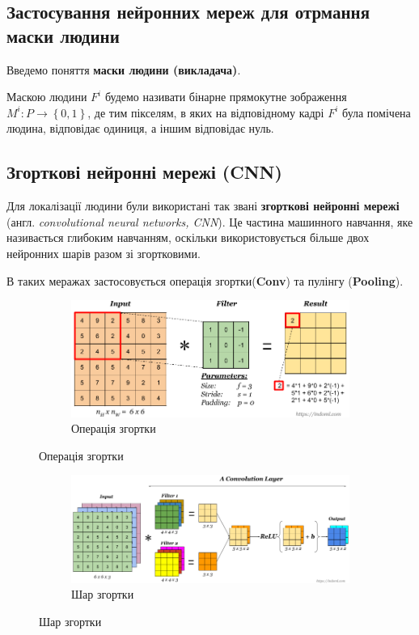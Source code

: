 \subsection{Застосування нейронних мереж для отрмання маски людини}

Введемо поняття \textbf{маски людини (викладача)}.

Маскою людини \(F^{i}\) будемо називати бінарне прямокутне 
зображення \(M^{i}:P \rightarrow \left\{ 0,1 \right\}\), де тим
пікселям, в яких на відповідному кадрі \(F^{i}\) була помічена людина,
відповідає одиниця, а іншим відповідає нуль.

\subsection{Згорткові нейронні мережі (CNN)}

Для локалізації людини були використані так звані \textbf{згорткові нейронні мережі} 
(англ. \textit{convolutional neural networks, CNN}).
Це частина машинного навчання, яке називається глибоким навчанням, оскільки використовується 
більше двох нейронних шарів разом зі згортковими.

В таких меражах застосовується операція згортки(\textbf{Conv}) \textsf{}
та пулінгу (\textbf{Pooling}).

\begin{figure}[H]
    \centering
    \begin{subfigure}[c]{0.5\textwidth}
        \centering
        \includegraphics[width=\textwidth]{images/cnn_convolution_operation}
        \caption{Операція згортки
        \label{fig:cnn:operation}
        }
    \end{subfigure}
\end{figure}
\begin{figure}
    \centering
    \ContinuedFloat
    \begin{subfigure}[c]{0.5\textwidth}
        \centering
        \includegraphics[width=\textwidth]{images/cnn_convolution_layer}
        \caption{Шар згортки
        \label{fig:cnn:layer}
        }
    \end{subfigure}
\end{figure}

